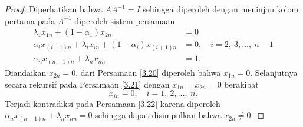 \begin{proof}
    Diperhatikan bahwa $AA^{-1}=I$ sehingga diperoleh dengan meninjau kolom pertama pada $A^{-1}$ diperoleh sistem persamaan
    \begin{align}
        \lambda_1x_{1n} + (1 - \alpha_1)x_{2n} &= 0 \label{3.20}\\
        \alpha_ix_{(i-1)n} + \lambda_ix_{in} + (1 - \alpha_i)x_{(i+1)n} &= 0, \quad i=2,~3,\dots,~n-1 \label{3.21}\\
        \alpha_nx_{(n-1)n} + \lambda_nx_{nn} &= 1.\label{3.22}
    \end{align}
    Diandaikan $x_{2n}=0$, dari Persamaan \eqref{3.20} diperoleh bahwa $x_{1n}=0$. Selanjutnya secara rekursif pada Persamaan \eqref{3.21} dengan $x_{1n}=x_{2n}=0$ berakibat
    \begin{equation*}
        x_{in}=0, \quad i=1,~2,\dots,~n.
    \end{equation*}
    Terjadi kontradiksi pada Persamaan \eqref{3.22} karena diperoleh $\alpha_nx_{(n-1)n} + \lambda_nx_{nn} = 0$ sehingga dapat disimpulkan bahwa $x_{2n} \neq 0$.


\end{proof}
